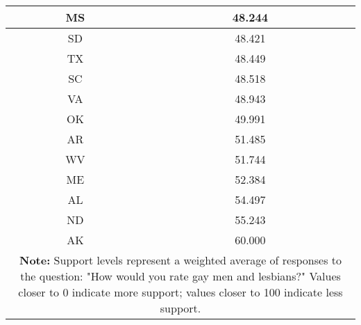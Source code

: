 \begin{longtable}{|c|c|}
\hline
MS & 48.244\\
\hline
SD & 48.421\\
\hline
TX & 48.449\\
\hline
SC & 48.518\\
\hline
VA & 48.943\\
\hline
OK & 49.991\\
\hline
AR & 51.485\\
\hline
WV & 51.744\\
\hline
ME & 52.384\\
\hline
AL & 54.497\\
\hline
ND & 55.243\\
\hline
AK & 60.000\\
\hline
\multicolumn{2}{p{0.8\linewidth}}{\small \textbf{Note:} Support levels represent a weighted average of responses to the question: "How would you rate gay men and lesbians?" Values closer to 0 indicate more support; values closer to 100 indicate less support.} \\ 
\end{longtable}
